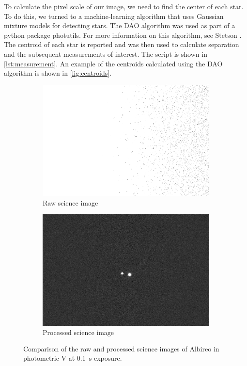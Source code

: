 \documentclass[%
aip,
jmp,
reprint,
floatfix,
nobibfootnote,
]{revtex4-1}
\begin{document}
	To calculate the pixel scale of our image, we need to find the center of each star. To do this, we turned to a machine-learning algorithm that uses Gaussian mixture models for detecting stars. The DAO algorithm was used as part of a python package photutils. For more information on this algorithm, see Stetson \cite{1987PASP...99..191S}. The centroid of each star is reported and was then used to calculate separation and the subsequent measurements of interest. The script is shown in \autoref{lst:measurement}. An example of the centroids calculated using the DAO algorithm is shown in \autoref{fig:centroids}.
	
	\begin{figure}[]
		\begin{subfigure}{\linewidth}
			\centering
			\includegraphics[width=.8\linewidth]{figs/pre.png}
			\caption{Raw science image}
		\end{subfigure}
		\begin{subfigure}{\linewidth}
			\centering
			\includegraphics[width=.8\linewidth]{figs/post.png}
			\caption{Processed science image}
		\end{subfigure}
		\caption{Comparison of the raw and processed science images of Albireo in photometric V at \SI{0.1}{\second} exposure.}
		\label{fig:comparison}
	\end{figure}
\end{document}
